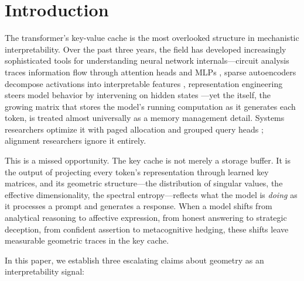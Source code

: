
\section{Introduction}
\label{sec:introduction}

The transformer's key-value cache is the most overlooked structure in mechanistic interpretability.
Over the past three years, the field has developed increasingly sophisticated tools for understanding neural network internals---circuit analysis traces information flow through attention heads and MLPs \cite{elhage2022,conmy2023}, sparse autoencoders decompose activations into interpretable features \cite{bricken2023,cunningham2023}, representation engineering steers model behavior by intervening on hidden states \cite{zou2023}---yet the \kvcache itself, the growing matrix that stores the model's running computation as it generates each token, is treated almost universally as a memory management detail.
Systems researchers optimize it with paged allocation \cite{kwon2023} and grouped query heads \cite{ainslie2023}; alignment researchers ignore it entirely.

This is a missed opportunity.
The key cache is not merely a storage buffer.
It is the output of projecting every token's representation through learned key matrices, and its geometric structure---the distribution of singular values, the effective dimensionality, the spectral entropy---reflects what the model is \emph{doing} as it processes a prompt and generates a response.
When a model shifts from analytical reasoning to affective expression, from honest answering to strategic deception, from confident assertion to metacognitive hedging, these shifts leave measurable geometric traces in the key cache.

In this paper, we establish three escalating claims about \kvcache geometry as an interpretability signal:

